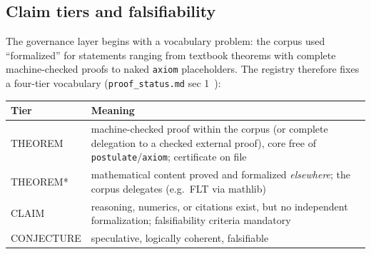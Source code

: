 
\subsection{Claim tiers and falsifiability}
\label{sec:tiers}
The governance layer begins with a vocabulary problem: the corpus
used ``formalized'' for statements ranging from textbook theorems
with complete machine-checked proofs to naked \texttt{axiom}
placeholders. The registry therefore fixes a four-tier vocabulary
(\texttt{proof\_status.md} sec 1~\cite{sylvaproofstatus2026}):

\begin{center}
\small
\begin{tabular}{@{}lp{11.6cm}@{}}
\toprule
Tier & Meaning \\
\midrule
THEOREM & machine-checked proof within the corpus (or complete
delegation to a checked external proof), core free of
\texttt{postulate}/\texttt{axiom}; certificate on file \\
THEOREM* & mathematical content proved and formalized
\emph{elsewhere}; the corpus delegates (e.g.\ FLT via mathlib) \\
CLAIM & reasoning, numerics, or citations exist, but no independent
formalization; falsifiability criteria mandatory \\
CONJECTURE & speculative, logically coherent, falsifiable \\
\bottomrule
\end{tabular}
\end{center}

